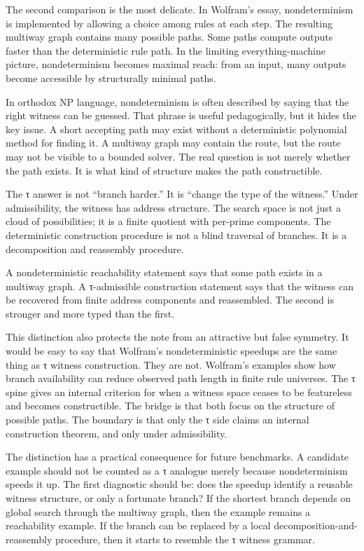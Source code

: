 \documentclass{pantarhei-researchnote}
\begin{document}
The second comparison is the most delicate. In Wolfram's essay,
nondeterminism is implemented by allowing a choice among rules at each
step. The resulting multiway graph contains many possible paths. Some
paths compute outputs faster than the deterministic rule path. In the
limiting everything-machine picture, nondeterminism becomes maximal reach:
from an input, many outputs become accessible by structurally minimal
paths.

In orthodox NP language, nondeterminism is often described by saying that
the right witness can be guessed. That phrase is useful pedagogically, but
it hides the key issue. A short accepting path may exist without a
deterministic polynomial method for finding it. A multiway graph may
contain the route, but the route may not be visible to a bounded solver.
The real question is not merely whether the path exists. It is what kind
of structure makes the path constructible.

The τ answer is not ``branch harder.'' It is ``change the type of the
witness.'' Under admissibility, the witness has address structure. The
search space is not just a cloud of possibilities; it is a finite
quotient with per-prime components. The deterministic construction
procedure is not a blind traversal of branches. It is a decomposition and
reassembly procedure.

\begin{remark}
A nondeterministic reachability statement says that some path exists in a
multiway graph. A τ-admissible construction statement says that the
witness can be recovered from finite address components and reassembled.
The second is stronger and more typed than the first.
\end{remark}

This distinction also protects the note from an attractive but false
symmetry. It would be easy to say that Wolfram's nondeterministic speedups
are the same thing as τ witness construction. They are not. Wolfram's
examples show how branch availability can reduce observed path length in
finite rule universes. The τ spine gives an internal criterion for when a
witness space ceases to be featureless and becomes constructible. The
bridge is that both focus on the structure of possible paths. The
boundary is that only the τ side claims an internal construction theorem,
and only under admissibility.

The distinction has a practical consequence for future benchmarks. A
candidate example should not be counted as a τ analogue merely because
nondeterminism speeds it up. The first diagnostic should be: does the
speedup identify a reusable witness structure, or only a fortunate
branch? If the shortest branch depends on global search through the
multiway graph, then the example remains a reachability example. If the
branch can be replaced by a local decomposition-and-reassembly procedure,
then it starts to resemble the τ witness grammar.
\end{document}
